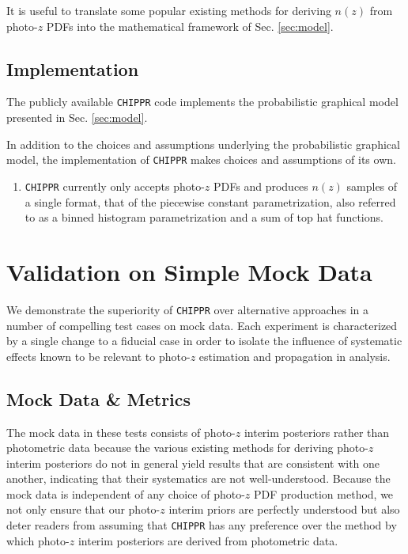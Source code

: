 \documentclass[iop]{emulateapj}
\newcommand{\chippr}{\texttt{CHIPPR} }
\begin{document}
It is useful to translate some popular existing methods for deriving $n(z)$ from photo-$z$ PDFs into the mathematical framework of Sec. \ref{sec:model}.

\subsection{Implementation}
\label{sec:implementation}

The publicly available \chippr code implements the probabilistic graphical model presented in Sec. \ref{sec:model}.  

In addition to the choices and assumptions underlying the probabilistic graphical model, the implementation of \chippr makes choices and assumptions of its own.

\begin{enumerate}
	\item \chippr currently only accepts photo-$z$ PDFs and produces $n(z)$ samples of a single format, that of the piecewise constant parametrization, also referred to as a binned histogram parametrization and a sum of top hat functions.
\end{enumerate}

\section{Validation on Simple Mock Data}
\label{sec:validation}

We demonstrate the superiority of \chippr over alternative approaches in a number of compelling test cases on mock data.  Each experiment is characterized by a single change to a fiducial case in order to isolate the influence of systematic effects known to be relevant to photo-$z$ estimation and propagation in analysis.  

\subsection{Mock Data \& Metrics}
\label{sec:validintro}

The mock data in these tests consists of photo-$z$ interim posteriors rather than photometric data because the various existing methods for deriving photo-$z$ interim posteriors do not in general yield results that are consistent with one another, indicating that their systematics are not well-understood.  Because the mock data is independent of any choice of photo-$z$ PDF production method, we not only ensure that our photo-$z$ interim priors are perfectly understood but also deter readers from assuming that \chippr has any preference over the method by which photo-$z$ interim posteriors are derived from photometric data.
\end{document}
